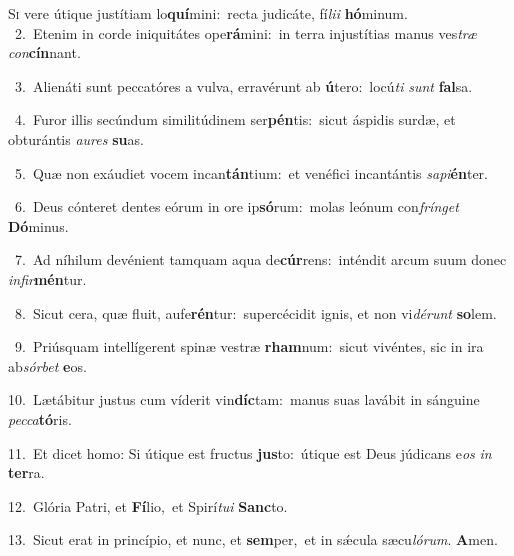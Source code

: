 \lettrine{\initial\textcolor{\initialcolor}{S}}{i} vere útique justítiam lo\-\textbf{quí}\-mini:~\star recta judicáte, fí\-\textit{li}\-\textit{i} \textbf{hó}\-minum.\\
{\numbfont\textcolor{\numbcolor}{~2.}}~Etenim in corde iniquitátes ope\-\textbf{rá}\-mini:~\star in terra injustítias manus ves\textit{træ} \textit{con}\-\textbf{cín}nant.\par
{\numbfont\textcolor{\numbcolor}{~3.}}~Alienáti sunt peccatóres a vulva, erravérunt ab \textbf{ú}\-tero:~\star locú\textit{ti} \textit{sunt} \textbf{fal}\-sa.\par
{\numbfont\textcolor{\numbcolor}{~4.}}~Furor illis secúndum similitúdinem ser\-\textbf{pén}\-tis:~\star sicut áspidis surdæ, et obturántis \textit{au}\-\textit{res} \textbf{su}\-as.\par
{\numbfont\textcolor{\numbcolor}{~5.}}~Quæ non exáudiet vocem incan\-\textbf{tán}\-tium:~\star et venéfici incantántis \textit{sa}\-\textit{pi}\textbf{én}ter.\par
{\numbfont\textcolor{\numbcolor}{~6.}}~Deus cónteret dentes eórum in ore ip\-\textbf{só}\-rum:~\star molas leónum con\-\textit{frín}\-\textit{get} \textbf{Dó}\-minus.\par
{\numbfont\textcolor{\numbcolor}{~7.}}~Ad níhilum devénient tamquam aqua de\-\textbf{cúr}\-rens:~\star inténdit arcum suum donec \textit{in}\-\textit{fir}\textbf{mén}tur.\par
{\numbfont\textcolor{\numbcolor}{~8.}}~Sicut cera, quæ fluit, aufe\-\textbf{rén}\-tur:~\star supercécidit ignis, et non vi\-\textit{dé}\-\textit{runt} \textbf{so}\-lem.\par
{\numbfont\textcolor{\numbcolor}{~9.}}~Priúsquam intellígerent spinæ vestræ \textbf{rham}\-num:~\star sicut vivéntes, sic in ira ab\-\textit{sór}\-\textit{bet} \textbf{e}\-os.\par
{\numbfont\textcolor{\numbcolor}{10.}}~Lætábitur justus cum víderit vin\-\textbf{díc}\-tam:~\star manus suas lavábit in sánguine \textit{pec}\-\textit{ca}\textbf{tó}ris.\par
{\numbfont\textcolor{\numbcolor}{11.}}~Et dicet homo: Si útique est fructus \textbf{jus}\-to:~\star útique est Deus júdicans e\textit{os} \textit{in} \textbf{ter}\-ra.\par
{\numbfont\textcolor{\numbcolor}{12.}}~Glória Patri, et \textbf{Fí}\-lio,~\star et Spirí\-\textit{tu}\-\textit{i} \textbf{Sanc}\-to.\par
{\numbfont\textcolor{\numbcolor}{13.}}~Sicut erat in princípio, et nunc, et \textbf{sem}\-per,~\star et in sǽcula sæcu\-\textit{ló}\-\textit{rum}. \textbf{A}\-men.\par
